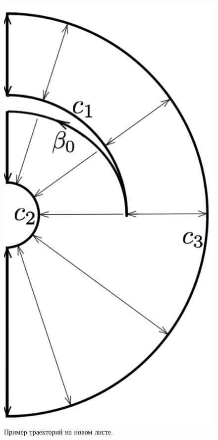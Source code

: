 \begin{figure}[!htb]
\centering
\includegraphics[scale=0.11]{images/section3_circular/atoms/II/bifurcation/trajectories_2.pdf}
    \caption{Пример траекторий на новом листе.}
        \label{fig:pt10:_II_trajectories_2}

\end{figure}
